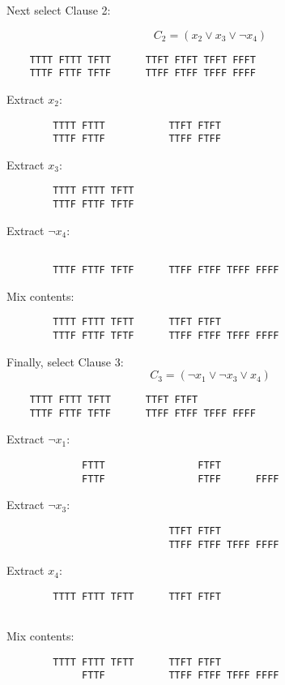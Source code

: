 Next select Clause 2:

\[
C_2 = (x_2 \vee x_3 \vee \neg x_4)
\]

\begin{verbatim}
	TTTT FTTT TFTT      TTFT FTFT TFFT FFFT
	TTTF FTTF TFTF      TTFF FTFF TFFF FFFF
\end{verbatim}		

	Extract $x_2$:
\begin{verbatim}
		TTTT FTTT           TTFT FTFT          
		TTTF FTTF           TTFF FTFF          
\end{verbatim}	

	Extract $x_3$:
\begin{verbatim}	
		TTTT FTTT TFTT                         
		TTTF FTTF TFTF                         
\end{verbatim}	

	Extract $\neg x_4$:
\begin{verbatim}
		                                       
		TTTF FTTF TFTF      TTFF FTFF TFFF FFFF	
\end{verbatim}

	Mix contents:
\begin{verbatim}
		TTTT FTTT TFTT      TTFT FTFT          
		TTTF FTTF TFTF      TTFF FTFF TFFF FFFF
\end{verbatim}

Finally, select Clause 3:	
\[
C_3 = (\neg x_1 \vee \neg x_3 \vee x_4)
\]
\begin{verbatim}
	TTTT FTTT TFTT      TTFT FTFT          
	TTTF FTTF TFTF      TTFF FTFF TFFF FFFF
\end{verbatim}	
	Extract $\neg x_1$:
\begin{verbatim}
		     FTTT                FTFT          
		     FTTF                FTFF      FFFF
\end{verbatim}

	Extract $\neg x_3$:
\begin{verbatim}
		                    TTFT FTFT          
		                    TTFF FTFF TFFF FFFF
\end{verbatim}	

	Extract $x_4$:
\begin{verbatim}
		TTTT FTTT TFTT      TTFT FTFT          
		                                       
\end{verbatim}

	Mix contents:
\begin{verbatim}
		TTTT FTTT TFTT      TTFT FTFT          
		     FTTF           TTFF FTFF TFFF FFFF
\end{verbatim}





